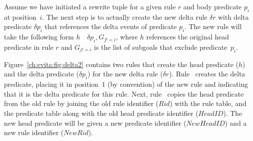 Assume we have initiated a rewrite tuple for a given rule $r$ and body
predicate $p_i$ at position~$i$.  The next step is to actually create the new
delta rule $\delta r$ with delta predicate $\delta p_i$ that references the
delta events of predicate $p_i$.  The new rule will take the following form
$h$~\ol{:-}~$\delta p_i, G_{j!=i}$, where $h$ references the original head predicate
in rule $r$ and $G_{j!=i}$ is the list of subgoals that exclude
predicate~$p_i$.

Figure~\ref{ch:evita:fig:delta2} contains two rules that create the head
predicate ($h$) and the delta predicate ($\delta p_i$) for the new delta rule
($\delta r$).  Rule~ creates the delta predicate, placing it in
position~$1$ (by convention) of the new rule and indicating that it is the
delta predicate for this rule.  Next, rule~ copies the head predicate
from the old rule by joining the old rule identifier ($Rid$) with the rule
table, and the predicate table along with the old head predicate identifier
($HeadID$).  The new head predicate will be given a new predicate identifier
($NewHeadID$) and a new rule identifier ($NewRid$).


